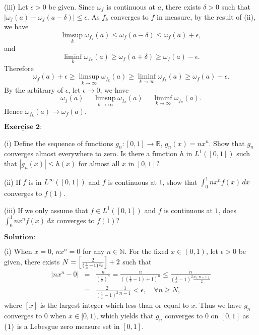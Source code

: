\documentclass[12pt,a4paper]{ctexart}
\begin{document}
\vspace{6pt}

(iii) Let $\epsilon > 0$ be given. Since $\omega_f$ is continuous at $a$, there exists $\delta > 0$ such that $|\omega_{f}(a) - \omega_{f}(a - \delta)| \leq \epsilon$. As $f_k$ converges to $f$ in measure, by the result of (ii), we have
$$\limsup_{k} \omega_{f_k}(a)   \leq \omega_{f} (a- \delta) \leq \omega_{f}(a) + \epsilon,$$
and
$$\liminf_{k} \omega_{f_k} (a) \geq \omega_{f}(a+ \delta) \geq \omega_{f}(a) - \epsilon.$$
Therefore
$$\omega_{f}(a) + \epsilon \geq \limsup_{k \to \infty} \omega_{f_k}(a)  \geq \liminf_{k \to \infty} \omega_{f_k} (a)  \geq \omega_{f}(a) - \epsilon.$$
By the arbitrary of $\epsilon$, let $\epsilon \to 0$, we have
$$\omega_{f}(a) = \limsup_{k \to \infty} \omega_{f_k}(a) = \liminf_{k \to \infty} \omega_{f_k} (a) .$$
Hence $\omega_{f_k} (a) \to \omega_{f}(a)$.


\newpage 

$\underline{\textbf{Exercise 2:}}$

(i) Define the sequence of functions $g_n: [0,1] \to \mathbb R$, $g_n(x) = n x^{n}$. Show that $g_n$ converges almost everywhere to zero. Is there a function $h$ in $L^1([0,1])$ such that $|g_n(x)| \leq h(x)$ for almost all $x$ in $[0,1]$?

(ii) If $f$ is in $L^{\infty}([0,1])$ and $f$ is continuous at $1$, show that $\int_0^1 n x^n f(x) \, d x$ converges to $f(1)$.

(iii) If we only assume that $f \in L^1([0,1])$ and $f$ is continuous at $1$, does
$\int_0^1 n x^n f(x) \, d x$ converges to $f(1)$?

\vspace{8pt}
$\textbf{Solution:}$

(i) When $x = 0$, $n x^n = 0$ for any $n \in \mathbb N$. For the fixed $x \in (0,1)$, let $\epsilon > 0$ be given, there exists $N = \Big{[} \frac{2}{(\frac{1}{x} - 1)^2 \epsilon} \Big{]} + 2$ such that
\begin{eqnarray*}
    |n x^n -0| & = &  \frac{n}{(\frac{1}{x})^n} = \frac{n}{((\frac{1}{x}-1) + 1)^n} \leq \frac{n}{(\frac{1}{x}-1)^2 \frac{n(n-1)}{2}} \\
    & = & \frac{2}{(\frac{1}{x}-1)^2} \frac{1}{n-1} < \epsilon, \quad \forall n \geq N,
\end{eqnarray*}
where $[x]$ is the largest integer which less than or equal to $x$. Thus we have $g_n$ converges to $0$ when $x \in[0,1)$, which yields that $g_n$ converges to $0$ on $[0,1]$ as $\{1\}$ is a Lebesgue zero measure set in $[0,1]$.
\end{document}
